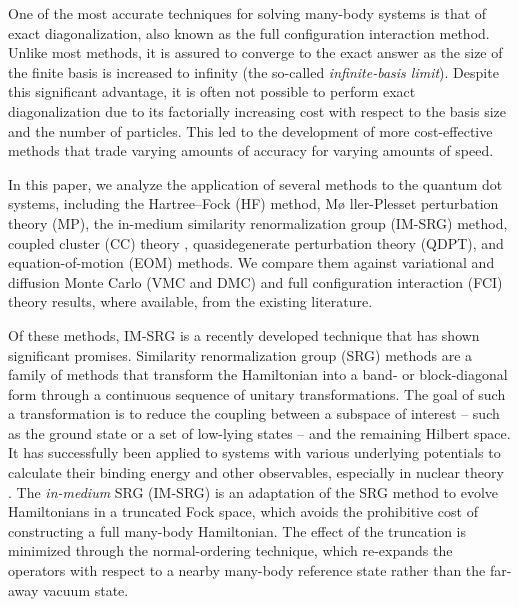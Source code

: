 One of the most accurate techniques for solving many-body systems is
that of exact diagonalization, also known as the full configuration
interaction method.  Unlike most methods, it is assured to converge to
the exact answer as the size of the finite basis is increased to
infinity (the so-called \textit{infinite-basis limit}).  Despite this
significant advantage, it is often not possible to perform exact
diagonalization due to its factorially increasing cost with respect to
the basis size and the number of particles.  This led to the
development of more cost-effective methods that trade varying amounts
of accuracy for varying amounts of speed.

In this paper, we analyze the application of several methods to the
quantum dot systems, including the Hartree--Fock (HF) method, M\o
ller-Plesset perturbation theory (MP), the in-medium similarity
renormalization group (IM-SRG) method, coupled cluster (CC)
theory \cite{PhysRevB.67.045320,heidari:114708,PhysRevB.84.115302},
quasidegenerate perturbation theory (QDPT), and equation-of-motion
(EOM) methods.  We compare them against variational and diffusion
Monte Carlo (VMC and
DMC) \cite{PhysRevB.68.035304,PhysRevB.62.8120,PhysRevB.84.115302,PhysRevB.54.4780}
and full configuration interaction (FCI)
theory \cite{olsen2013thesis,JJAP.36.3924,PhysRevB.56.6428,2008arXiv0810.2644K,rontani:124102}
results, where available, from the existing literature.

Of these methods, IM-SRG is a recently developed technique that has
shown significant promises.  Similarity renormalization group (SRG)
methods are a family of methods that transform the Hamiltonian into a
band- or block-diagonal form through a continuous sequence of unitary
transformations.  The goal of such a transformation is to reduce the
coupling between a subspace of interest -- such as the ground state or
a set of low-lying states -- and the remaining Hilbert space.  It has
successfully been applied to systems with various underlying
potentials to calculate their binding energy and other observables,
especially in nuclear
theory \cite{ScottSRG,PhysRevC.75.061001,SRGThreeDim}.
The \emph{in-medium} SRG (IM-SRG) is an adaptation of the SRG method
to evolve Hamiltonians in a truncated Fock space, which avoids the
prohibitive cost of constructing a full many-body Hamiltonian.  The
effect of the truncation is minimized through the normal-ordering
technique, which re-expands the operators with respect to a nearby
many-body reference state rather than the far-away vacuum state.

